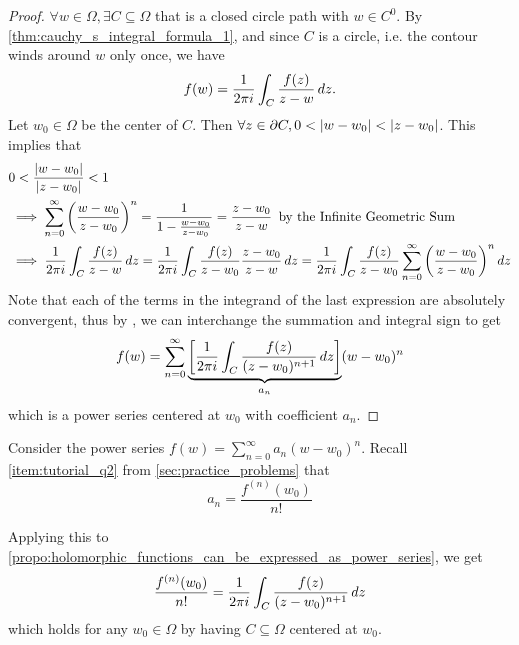 \documentclass[notoc,notitlepage]{tufte-book}
\begin{document}
\begin{proof}
	$\forall w \in \Omega, \exists C \subseteq \Omega$ that is a closed circle path with $w \in C^0$. By \cref{thm:cauchy_s_integral_formula_1}, and since $C$ is a circle, i.e. the contour winds around $w$ only once, we have
	\begin{equation*}
		f(w) = \frac{1}{2 \pi i} \int_{C} \frac{f(z)}{z - w} \mathop{}\!d{z}.
	\end{equation*}
	Let $w_0 \in \Omega$ be the center of $C$. Then $\forall z \in \partial C, 0 < \left|w - w_0\right| < \left|z - w_0\right|$. This implies that
	\begin{align*}
		&0 < \frac{\left|w - w_0\right|}{\left|z - w_0\right|} < 1 \\
		&\implies \sum_{n=0}^{\infty} \left(\frac{w - w_0}{z - w_0} \right)^n = \frac{1}{1 - \frac{w - w_0}{z - w_0}} = \frac{z - w_0}{z - w} \enspace \text{by the Infinite Geometric Sum} \\
		&\implies \frac{1}{2 \pi i} \int_{C} \frac{f(z)}{z - w} \mathop{}\!d{z} = \frac{1}{2 \pi i} \int_{C} \frac{f(z)}{z - w_0} \frac{z - w_0}{z - w} \mathop{}\!d{z} = \frac{1}{2 \pi i} \int_{C} \frac{f(z)}{z - w_0} \sum_{n=0}^{\infty} \left( \frac{w - w_0}{z - w_0} \right)^n \mathop{}\!d{z}
	\end{align*}
	Note that each of the terms in the integrand of the last expression are absolutely convergent, thus by , we can interchange the summation and integral sign to get
	\begin{equation*}
		f(w) = \sum_{n=0}^{\infty} \underbrace{\left[ \frac{1}{2 \pi i} \int_{C} \frac{f(z)}{(z - w_0)^{n + 1}} \mathop{}\!d{z} \right]}_{a_n} (w - w_0)^n
	\end{equation*}
	which is a power series centered at $w_0$ with coefficient $a_n$.
\end{proof}

\begin{note}[Recall]
	Consider the power series $f(w) = \sum_{n=0}^{\infty} a_n (w - w_0)^n$. Recall \cref{item:tutorial_q2} from \cref{sec:practice_problems} that
	\begin{equation*}
		a_n = \frac{f^{(n)}(w_0)}{n!}
	\end{equation*}

	Applying this to \cref{propo:holomorphic_functions_can_be_expressed_as_power_series}, we get
	\begin{equation*}
		\frac{f^{(n)} (w_0)}{n!} = \frac{1}{2 \pi i} \int_{C} \frac{f(z)}{(z - w_0)^{n + 1}} \mathop{}\!d{z}
	\end{equation*}
	which holds for any $w_0 \in \Omega$ by having $C \subseteq \Omega$ centered at $w_0$.
\end{note}
\end{document}
